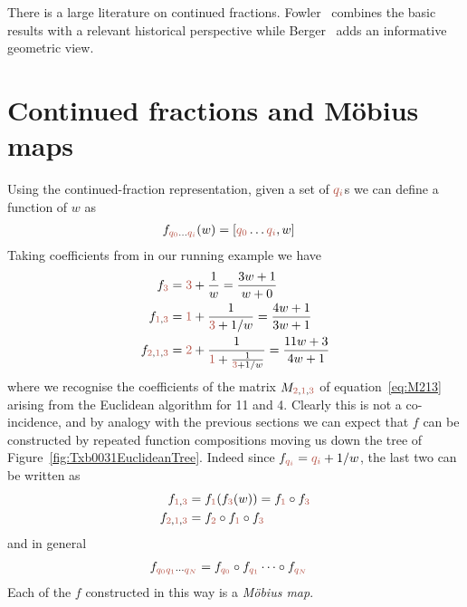 There is a large literature on continued fractions. Fowler~\cite{fowlerMathematicsPlatoAcademy1999} combines the basic results with a relevant historical perspective while Berger~\cite{bergerGeometryRevealedJacob2010} adds an informative geometric view. 

\section{Continued fractions and M\"obius maps}
\newcommand{\wC}{w}%
Using the continued-fraction representation, given a set of $\jqix{i}$s we can define a function of $\wC$ as
\begin{align}
	f_{\jqix{0}\ldots \jqix{i}}(\wC) &= [\jqix{0}\ldots \jqix{i}  , \wC] 
\end{align}
Taking coefficients from in our running example we  have 
\begin{align}
	\begin{split}
f_{\jqn{3}}&=  \jqn{3} + \frac{1}{\wC} = \frac{3 \wC+1}{\wC+0} 
\\
f_{\jqn{1},\jqn{3}}  &=  \jqn{1} + \frac{1}{\jqn{3}+1/\wC} = \frac{4 \wC+1}{3\wC+1} 
\\ 
f_{\jqn{2},\jqn{1},\jqn{3}}  &=  \jqn{2} + \frac{1}{\jqn{1}+\frac{1}{
		\jqn{3}+1/\wC}} = \frac{11 \wC+3}{4\wC+1} %
	\end{split}\label{eq:fq}
\end{align}
where we recognise the coefficients of the matrix $M_{\jqn{2},\jqn{1},\jqn{3}}$ of equation~\ref{eq:M213} arising from the Euclidean algorithm for 11 and 4. Clearly this is not a co-incidence, and by analogy with the previous sections we can expect that $f$ can be constructed by repeated function compositions moving us down the tree of Figure~\ref{fig:Txb0031EuclideanTree}. 
Indeed since $	f_{\jqix{i}}  =  \jqix{i} +1/{\wC}  $, the last two can be written as
\begin{align}	
	f_{\jqn{1},\jqn{3}}  &=  	f_{\jqn{1}}(	f_{\jqn{3}}(\wC)) = 	f_{\jqn{1}}\circ 	f_{\jqn{3}}
	\\	f_{\jqn{2},\jqn{1},\jqn{3}}  &=
	 f_{\jqn{2}}\circ 	f_{\jqn{1}} \circ 	f_{\jqn{3}}
\end{align}
and in general
\begin{align}
	f_{\jqix{0}\jqix{1}\cdots\jqix{N}} &= 	f_{\jqix{0}}\circ f_{\jqix{1}}\cdots\circ f_{\jqix{N}}
\end{align}
Each of the $f$ constructed in this way is a \textit{M\"obius map}.


